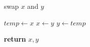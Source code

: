 \documentclass[a4paper, 12pt]{article}
\begin{document}
	
	\begin{algorithm}

		\renewcommand{\thealgorithm}{3.1.11}
		
		\caption{swap $x$ and $y$}\label{swap}
		
		\begin{algorithmic}[1]
			
			
			\State $temp \gets x$
			\State $x \gets y$
			\State $y \gets temp$

			\State \textbf{return} $x, y$
			\EndProcedure
			
		\end{algorithmic}

	\end{algorithm}
\end{document}
